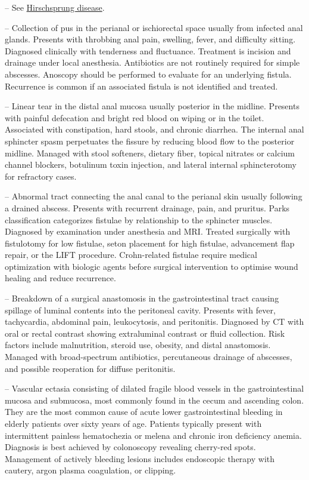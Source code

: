 -- See \hyperlink{Hirschsprung Disease}{Hirschsprung disease}.

-- Collection of pus in the perianal or ischiorectal space usually from infected anal glands. Presents with throbbing anal pain, swelling, fever, and difficulty sitting. Diagnosed clinically with tenderness and fluctuance. Treatment is incision and drainage under local anesthesia. Antibiotics are not routinely required for simple abscesses. Anoscopy should be performed to evaluate for an underlying fistula. Recurrence is common if an associated fistula is not identified and treated.

-- Linear tear in the distal anal mucosa usually posterior in the midline. Presents with painful defecation and bright red blood on wiping or in the toilet. Associated with constipation, hard stools, and chronic diarrhea. The internal anal sphincter spasm perpetuates the fissure by reducing blood flow to the posterior midline. Managed with stool softeners, dietary fiber, topical nitrates or calcium channel blockers, botulinum toxin injection, and lateral internal sphincterotomy for refractory cases.

-- Abnormal tract connecting the anal canal to the perianal skin usually following a drained abscess. Presents with recurrent drainage, pain, and pruritus. Parks classification categorizes fistulae by relationship to the sphincter muscles. Diagnosed by examination under anesthesia and MRI. Treated surgically with fistulotomy for low fistulae, seton placement for high fistulae, advancement flap repair, or the LIFT procedure. Crohn-related fistulae require medical optimization with biologic agents before surgical intervention to optimise wound healing and reduce recurrence.

-- Breakdown of a surgical anastomosis in the gastrointestinal tract causing spillage of luminal contents into the peritoneal cavity. Presents with fever, tachycardia, abdominal pain, leukocytosis, and peritonitis. Diagnosed by CT with oral or rectal contrast showing extraluminal contrast or fluid collection. Risk factors include malnutrition, steroid use, obesity, and distal anastomosis. Managed with broad-spectrum antibiotics, percutaneous drainage of abscesses, and possible reoperation for diffuse peritonitis.

-- Vascular ectasia consisting of dilated fragile blood vessels in the gastrointestinal mucosa and submucosa, most commonly found in the cecum and ascending colon. They are the most common cause of acute lower gastrointestinal bleeding in elderly patients over sixty years of age. Patients typically present with intermittent painless hematochezia or melena and chronic iron deficiency anemia. Diagnosis is best achieved by colonoscopy revealing cherry-red spots. Management of actively bleeding lesions includes endoscopic therapy with cautery, argon plasma coagulation, or clipping.

